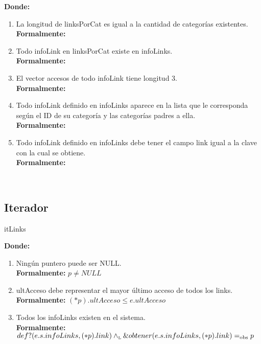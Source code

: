 \documentclass[10pt, a4paper]{article}
\begin{document}
{\bf Donde:}

\begin{enumerate}
  \item La longitud de linksPorCat es igual a la cantidad de categor\'ias existentes.\\
		{\bf Formalmente:} 

  \item Todo infoLink en linksPorCat existe en infoLinks.\\
		{\bf Formalmente:} 

  \item El vector accesos de todo infoLink tiene longitud 3.\\
		{\bf Formalmente:} 

  \item Todo infoLink definido en infoLinks aparece en la lista que le corresponda seg\'un el ID de su categor\'ia y las categor\'ias padres a ella.\\
		{\bf Formalmente:}

  \item Todo infoLink definido en infoLinks debe tener el campo link igual a la clave con la cual se obtiene.\\
		{\bf Formalmente:}
\end{enumerate}

~

\subsection{Iterador}

\begin{Estructura}{itLinks}
	\begin{Tupla}
	\end{Tupla}
\end{Estructura}

\mbox{}

{\bf Donde:}

\begin{enumerate}
  \item Ning\'un puntero puede ser NULL.\\
		{\bf Formalmente:} $p \neq NULL$

  \item ultAcceso debe representar el mayor \'ultimo acceso de todos los links.\\
		{\bf Formalmente:} $(*p).ultAcceso \leq e.ultAcceso$

  \item Todos los infoLinks existen en el sistema.\\
		{\bf Formalmente:} $def?(e.s.infoLinks, (*p).link) \land_{\mathrm{\scriptscriptstyle{L}}} \&obtener(e.s.infoLinks, (*p).link) =_{\mathrm{obs}} p$
\end{enumerate}
\end{document}
